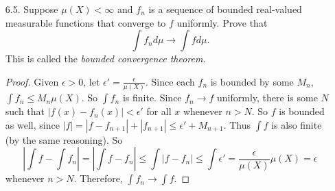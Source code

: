 \documentclass[10pt]{article}
\newcommand{\Int}{{\displaystyle \int}}
\begin{document}
\begin{enumerate}
\item[6.5.] Suppose $\mu(X) < \infty$ and $f_n$ is a sequence of bounded real-valued measurable functions that converge to $f$ uniformly.  Prove that
$$
\int f_n d\mu \rightarrow \int f d\mu.
$$
This is called the \emph{bounded convergence theorem}.

\begin{proof}

Given $\epsilon > 0$, let $\epsilon ' = \frac{\epsilon}{\mu(X)}$.  Since each $f_n$ is bounded by some $M_n$, $\Int f_n \leq M_n \mu(X)$.  So $\Int f_n$ is finite.  Since $f_n \rightarrow f$ uniformly, there is some $N$ such that $|f(x) - f_n(x)| < \epsilon'$ for all $x$ whenever $n > N$.  So $f$ is bounded as well, since $|f| = |f-f_{n+1}| + |f_{n+1}| \leq \epsilon' + M_{n+1}$.  Thus $\Int f$ is also finite (by the same reasoning).  So
$$
\left| \Int f - \Int f_n \right| = \left| \Int f - f_n \right| \leq \Int |f - f_n| \leq \Int \epsilon' = \frac{\epsilon}{\mu(X)} \mu(X) = \epsilon
$$
whenever $n > N$.  Therefore, $\Int f_n \rightarrow \Int f$.
\end{proof}

\end{enumerate}
\end{document}
